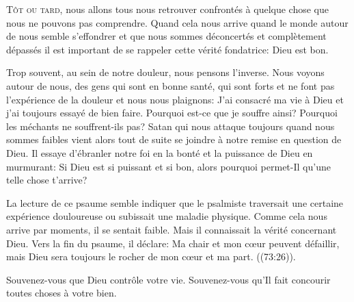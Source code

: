 


\lettrine{T}{ôt ou tard,} nous allons tous nous retrouver confrontés
 à quelque chose que nous ne pouvons pas comprendre.
 Quand cela nous arrive \ocadr quand le monde autour de nous semble s'effondrer
 et que nous sommes déconcertés et complètement dépassés \fcadr{}
 il est important de se rappeler cette vérité fondatrice: Dieu est bon.

Trop souvent, au sein de notre douleur, nous pensons l'inverse.
 Nous voyons autour de nous, des gens qui sont en bonne santé,
 qui sont forts et ne font pas l'expérience de la douleur
 et nous nous plaignons:
 \Og J'ai consacré ma vie à Dieu et j'ai toujours essayé de bien faire.
 Pourquoi est-ce que je souffre ainsi?
 Pourquoi les méchants ne souffrent-ils pas? \Fg{}
 Satan \ocadr qui nous attaque toujours quand nous sommes faibles \fcadr{}
 vient alors tout de suite se joindre à notre remise en question de Dieu.
 Il essaye d'ébranler notre foi en la bonté et la puissance de Dieu
 en murmurant:
 \Og Si Dieu est si puissant et si bon, alors pourquoi permet-Il
 qu'une telle chose t'arrive? \Fg{}


La lecture de ce psaume semble indiquer que le psalmiste traversait
 une certaine expérience douloureuse ou subissait une maladie physique.
 Comme cela nous arrive par moments, il se sentait faible.
 Mais il connaissait la vérité concernant Dieu.
 Vers la fin du psaume, il déclare:
 \Og Ma chair et mon c\oe{}ur peuvent défaillir,
 mais Dieu sera toujours le rocher de mon c\oe{}ur et ma part. \Fg{}
 ((73:26)).

Souvenez-vous que Dieu contrôle votre vie.
 Souvenez-vous qu'Il fait concourir toutes choses à votre bien. 

\dvrule




